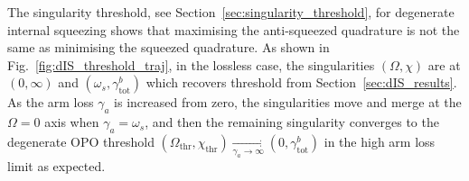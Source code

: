 \newpage
The singularity threshold, see Section~\ref{sec:singularity_threshold}, for degenerate internal squeezing shows that maximising the anti-squeezed quadrature is not the same as minimising the squeezed quadrature.
As shown in Fig.~\ref{fig:dIS_threshold_traj}, in the lossless case, the singularities $(\Omega,\chi)$ are at $(0,\infty)$ and $(\omega_s,\gamma^b_\text{tot})$ which recovers threshold from Section~\ref{sec:dIS_results}. %
As the arm loss $\gamma_a$ is increased from zero, the singularities move and merge at the $\Omega=0$ axis when $\gamma_a=\omega_s$, and then the remaining singularity converges to the degenerate OPO threshold $(\Omega_\text{thr},\chi_\text{thr})\xrightarrow[\gamma_a\rightarrow\infty]{}(0,\gamma^b_\mathrm{tot})$ in the high arm loss limit as expected.
